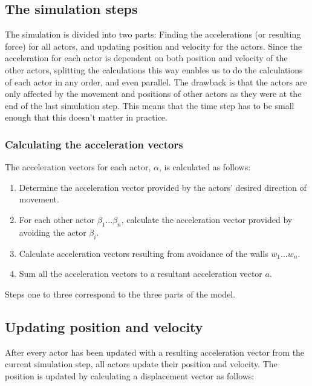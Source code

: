 
\subsection{The simulation steps}
The simulation is divided into two parts: Finding the accelerations (or 
resulting force) for all actors, and updating position and velocity for the 
actors.  Since the acceleration for each actor is dependent on both position 
and velocity of the other actors, splitting the calculations this way enables 
us to do the calculations of each actor in any order, and even parallel. The 
drawback is that the actors are only affected by the movement and positions of 
other actors as they were at the end of the last simulation step. This means 
that the time step has to be small enough that this doesn't matter in 
practice.

\subsubsection{Calculating the acceleration vectors}
The acceleration vectors for each actor, $\alpha$, is calculated as follows:

\begin{enumerate}
    \item Determine the acceleration vector provided by the actors' desired 
        direction of movement.
    \item For each other actor $\beta_1\dots\beta_n$, calculate the 
        acceleration vector provided by avoiding the actor $\beta_i$.
    \item Calculate acceleration vectors resulting from avoidance of the walls 
        $w_1\dots w_n$.
    \item Sum all the acceleration vectors to a resultant acceleration vector 
        $a$.
\end{enumerate}

Steps one to three correspond to the three parts of the model.

\subsection{Updating position and velocity}
After every actor has been updated with a resulting acceleration vector from 
the current simulation step, all actors update their position and velocity.  
The position is updated by calculating a displacement vector as follows:

